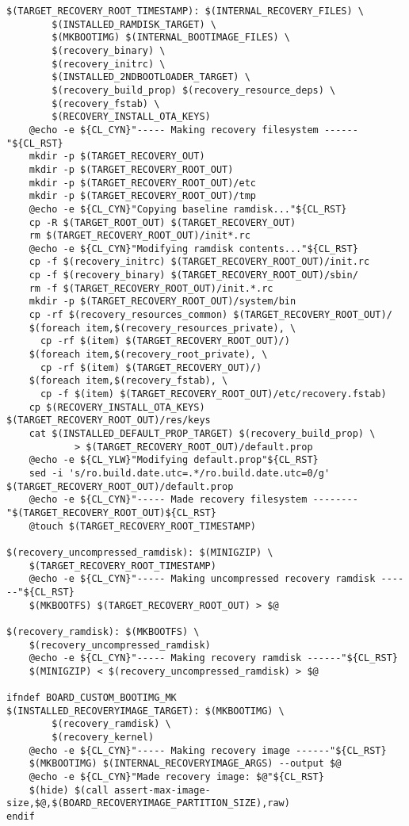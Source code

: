\documentclass[12pt,a4paper]{article}
\begin{document}
\begin{verbatim}
$(TARGET_RECOVERY_ROOT_TIMESTAMP): $(INTERNAL_RECOVERY_FILES) \
		$(INSTALLED_RAMDISK_TARGET) \
		$(MKBOOTIMG) $(INTERNAL_BOOTIMAGE_FILES) \
		$(recovery_binary) \
		$(recovery_initrc) \
		$(INSTALLED_2NDBOOTLOADER_TARGET) \
		$(recovery_build_prop) $(recovery_resource_deps) \
		$(recovery_fstab) \
		$(RECOVERY_INSTALL_OTA_KEYS)
	@echo -e ${CL_CYN}"----- Making recovery filesystem ------"${CL_RST}
	mkdir -p $(TARGET_RECOVERY_OUT)
	mkdir -p $(TARGET_RECOVERY_ROOT_OUT)
	mkdir -p $(TARGET_RECOVERY_ROOT_OUT)/etc
	mkdir -p $(TARGET_RECOVERY_ROOT_OUT)/tmp
	@echo -e ${CL_CYN}"Copying baseline ramdisk..."${CL_RST}
	cp -R $(TARGET_ROOT_OUT) $(TARGET_RECOVERY_OUT)
	rm $(TARGET_RECOVERY_ROOT_OUT)/init*.rc
	@echo -e ${CL_CYN}"Modifying ramdisk contents..."${CL_RST}
	cp -f $(recovery_initrc) $(TARGET_RECOVERY_ROOT_OUT)/init.rc
	cp -f $(recovery_binary) $(TARGET_RECOVERY_ROOT_OUT)/sbin/
	rm -f $(TARGET_RECOVERY_ROOT_OUT)/init.*.rc
	mkdir -p $(TARGET_RECOVERY_ROOT_OUT)/system/bin
	cp -rf $(recovery_resources_common) $(TARGET_RECOVERY_ROOT_OUT)/
	$(foreach item,$(recovery_resources_private), \
	  cp -rf $(item) $(TARGET_RECOVERY_ROOT_OUT)/)
	$(foreach item,$(recovery_root_private), \
	  cp -rf $(item) $(TARGET_RECOVERY_OUT)/)
	$(foreach item,$(recovery_fstab), \
	  cp -f $(item) $(TARGET_RECOVERY_ROOT_OUT)/etc/recovery.fstab)
	cp $(RECOVERY_INSTALL_OTA_KEYS) $(TARGET_RECOVERY_ROOT_OUT)/res/keys
	cat $(INSTALLED_DEFAULT_PROP_TARGET) $(recovery_build_prop) \
	        > $(TARGET_RECOVERY_ROOT_OUT)/default.prop
	@echo -e ${CL_YLW}"Modifying default.prop"${CL_RST}
	sed -i 's/ro.build.date.utc=.*/ro.build.date.utc=0/g' $(TARGET_RECOVERY_ROOT_OUT)/default.prop
	@echo -e ${CL_CYN}"----- Made recovery filesystem --------"$(TARGET_RECOVERY_ROOT_OUT)${CL_RST}
	@touch $(TARGET_RECOVERY_ROOT_TIMESTAMP)

$(recovery_uncompressed_ramdisk): $(MINIGZIP) \
    $(TARGET_RECOVERY_ROOT_TIMESTAMP)
	@echo -e ${CL_CYN}"----- Making uncompressed recovery ramdisk ------"${CL_RST}
	$(MKBOOTFS) $(TARGET_RECOVERY_ROOT_OUT) > $@

$(recovery_ramdisk): $(MKBOOTFS) \
    $(recovery_uncompressed_ramdisk)
	@echo -e ${CL_CYN}"----- Making recovery ramdisk ------"${CL_RST}
	$(MINIGZIP) < $(recovery_uncompressed_ramdisk) > $@

ifndef BOARD_CUSTOM_BOOTIMG_MK
$(INSTALLED_RECOVERYIMAGE_TARGET): $(MKBOOTIMG) \
		$(recovery_ramdisk) \
		$(recovery_kernel)
	@echo -e ${CL_CYN}"----- Making recovery image ------"${CL_RST}
	$(MKBOOTIMG) $(INTERNAL_RECOVERYIMAGE_ARGS) --output $@
	@echo -e ${CL_CYN}"Made recovery image: $@"${CL_RST}
	$(hide) $(call assert-max-image-size,$@,$(BOARD_RECOVERYIMAGE_PARTITION_SIZE),raw)
endif


\end{verbatim}
\end{document}
